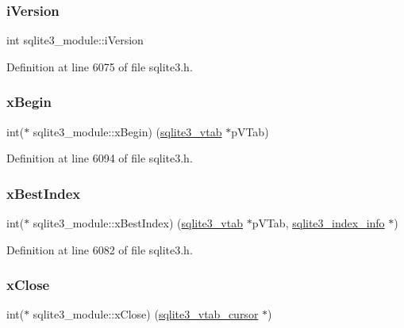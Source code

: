 \subsubsection{\texorpdfstring{i\+Version}{iVersion}}
{\footnotesize\ttfamily int sqlite3\+\_\+module\+::i\+Version}



Definition at line 6075 of file sqlite3.\+h.

\mbox{\label{structsqlite3__module_af190bd5cbd1e3ff30a09ca7b015af1a1}} 
\subsubsection{\texorpdfstring{x\+Begin}{xBegin}}
{\footnotesize\ttfamily int($\ast$ sqlite3\+\_\+module\+::x\+Begin) (\mbox{\hyperlink{structsqlite3__vtab}{sqlite3\+\_\+vtab}} $\ast$p\+V\+Tab)}



Definition at line 6094 of file sqlite3.\+h.

\mbox{\label{structsqlite3__module_aad92b2cd56253baaeac656d7693ce4af}} 
\subsubsection{\texorpdfstring{x\+Best\+Index}{xBestIndex}}
{\footnotesize\ttfamily int($\ast$ sqlite3\+\_\+module\+::x\+Best\+Index) (\mbox{\hyperlink{structsqlite3__vtab}{sqlite3\+\_\+vtab}} $\ast$p\+V\+Tab, \mbox{\hyperlink{structsqlite3__index__info}{sqlite3\+\_\+index\+\_\+info}} $\ast$)}



Definition at line 6082 of file sqlite3.\+h.

\mbox{\label{structsqlite3__module_acc6c4d6d41f3d056e297eea9725b887c}} 
\subsubsection{\texorpdfstring{x\+Close}{xClose}}
{\footnotesize\ttfamily int($\ast$ sqlite3\+\_\+module\+::x\+Close) (\mbox{\hyperlink{structsqlite3__vtab__cursor}{sqlite3\+\_\+vtab\+\_\+cursor}} $\ast$)}



